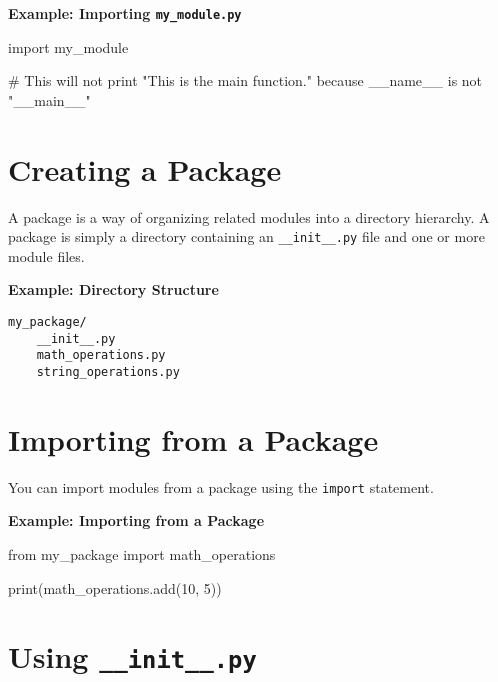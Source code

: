 \documentclass[
  letterpaper,
  DIV=11,
  numbers=noendperiod]{scrreprt}
\newenvironment{Shaded}{\begin{snugshade}}{\end{snugshade}}
\newcommand{\BuiltInTok}[1]{\textcolor[rgb]{0.00,0.23,0.31}{#1}}
\newcommand{\CommentTok}[1]{\textcolor[rgb]{0.37,0.37,0.37}{#1}}
\newcommand{\DecValTok}[1]{\textcolor[rgb]{0.68,0.00,0.00}{#1}}
\newcommand{\ImportTok}[1]{\textcolor[rgb]{0.00,0.46,0.62}{#1}}
\newcommand{\NormalTok}[1]{\textcolor[rgb]{0.00,0.23,0.31}{#1}}
\begin{document}
\textbf{Example: Importing \texttt{my\_module.py}}

\begin{Shaded}
\begin{Highlighting}[]
\ImportTok{import}\NormalTok{ my\_module}

\CommentTok{\# This will not print "This is the main function." because \_\_name\_\_ is not "\_\_main\_\_"}
\end{Highlighting}
\end{Shaded}

\section{Creating a Package}\label{creating-a-package}

A package is a way of organizing related modules into a directory
hierarchy. A package is simply a directory containing an
\texttt{\_\_init\_\_.py} file and one or more module files.

\textbf{Example: Directory Structure}

\begin{verbatim}
my_package/
    __init__.py
    math_operations.py
    string_operations.py
\end{verbatim}

\section{Importing from a Package}\label{importing-from-a-package}

You can import modules from a package using the \texttt{import}
statement.

\textbf{Example: Importing from a Package}

\begin{Shaded}
\begin{Highlighting}[]
\ImportTok{from}\NormalTok{ my\_package }\ImportTok{import}\NormalTok{ math\_operations}

\BuiltInTok{print}\NormalTok{(math\_operations.add(}\DecValTok{10}\NormalTok{, }\DecValTok{5}\NormalTok{))}
\end{Highlighting}
\end{Shaded}

\section{\texorpdfstring{Using
\texttt{\_\_init\_\_.py}}{Using \_\_init\_\_.py}}\label{using-__init__.py}
\end{document}
